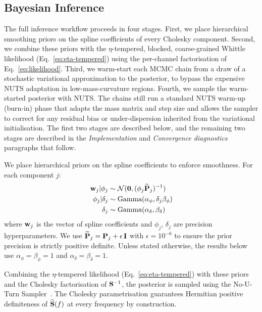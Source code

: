 \documentclass[%
	reprint,
	nofootinbib,
	amsmath,
	amssymb,
	aps,
]{revtex4-2}
\begin{document}
	\subsection{Bayesian Inference}
	\label{sec:bayesian-inference}
	The full inference workflow proceeds in four stages. First, we place
	hierarchical smoothing priors on the spline coefficients of every
	Cholesky component. Second, we combine these priors with the
	$\eta$-tempered, blocked, coarse-grained Whittle likelihood
	(Eq.~\ref{eq:eta-tempered}) using the per-channel factorisation of
	Eq.~\eqref{eq:likelihood}. Third, we warm-start each MCMC chain from
	a draw of a stochastic variational approximation to the posterior, to
	bypass the expensive NUTS adaptation in low-mass-curvature regions.
	Fourth, we sample the warm-started posterior with NUTS. The chains
	still run a standard NUTS warm-up (burn-in) phase that adapts the
	mass matrix and step size and allows the sampler to correct for any
	residual bias or under-dispersion inherited from the variational
	initialisation. 
	The first two stages
	are described below, and the remaining two stages are described in
	the \emph{Implementation} and \emph{Convergence diagnostics}
	paragraphs that follow.

	We place hierarchical priors on the spline coefficients to enforce smoothness.
	For each component $j$:
	\begin{align}
		\bold{w}_{j} | \phi_{j} & \sim \mathcal{N}(\bold{0}, (\phi_{j} \widetilde{\bold{P}}_{j})^{-1})  \\
		\phi_{j} | \delta_{j}   & \sim \text{Gamma}(\alpha_{\phi}, \delta_{j} \beta_{\phi}) \\
		\delta_{j}              & \sim \text{Gamma}(\alpha_{\delta}, \beta_{\delta})
	\end{align}
	where $\bold{w}_{j}$ is the vector of spline coefficients and
	$\phi_{j}$, $\delta_{j}$ are precision hyperparameters. We use
	$\widetilde{\bold{P}}_{j}=\bold{P}_{j}+\epsilon\,\mathbf{I}$ with
	$\epsilon=10^{-6}$ to ensure the prior precision is strictly positive
	definite. Unless stated otherwise, the results below use
	$\alpha_{\phi}=\beta_{\phi}=1$ and
	$\alpha_{\delta}=\beta_{\delta}=1$.

	Combining the $\eta$-tempered likelihood
	(Eq.~\ref{eq:eta-tempered}) with these priors and the Cholesky
	factorisation of $\S^{-1}$, the posterior is sampled using the No-U-Turn
	Sampler~\citep[NUTS;][]{hoffman2014_NUTS}. The Cholesky parametrisation
	guarantees Hermitian positive definiteness of $\widehat{\S}(f)$ at every
	frequency by construction.
\end{document}
